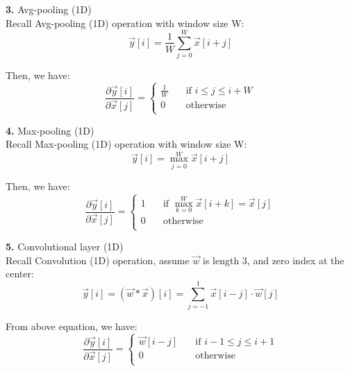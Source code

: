 \begin{description}
\item{\bf \large 3. } Avg-pooling (1D) \\
Recall Avg-pooling (1D) operation with window size W: 
\begin{equation}
	\vec{y}[i] = \frac{1}{W} \sum_{j=0}^W \vec{x}[i + j]
\end{equation}

Then, we have:
\begin{equation}
	\frac{\partial \vec{y}[i]}{\partial \vec{x}[j]} = 
		\begin{cases}
			\frac{1}{W}	& \quad \text{if } i \leq j \leq i + W \\
			0				& \quad \text{otherwise} \\
		\end{cases}
\end{equation}

\item{\bf \large 4. } Max-pooling (1D) \\
Recall Max-pooling (1D) operation with window size W: 
\begin{equation}
	\vec{y}[i] = \max_{j=0}^W \vec{x}[i + j]
\end{equation}

Then, we have:
\begin{equation}
	\frac{\partial \vec{y}[i]}{\partial \vec{x}[j]} = 
		\begin{cases}
			1	& 	\quad \text{if } \max_{k=0}^W \vec{x}[i + k] = \vec{x}[j] \\
			0	& 	\quad \text{otherwise} \\
		\end{cases}
\end{equation}


\item{\bf \large 5. } Convolutional layer (1D)\\
Recall Convolution (1D) operation, assume $\vec{w}$ is length 3, and zero index at the center:
\begin{equation}
	\vec{y}[i] = (\vec{w} \ast \vec{x})[i] = \sum_{j=-1}^1 \vec{x}[i-j] \cdot \vec{w}[j]
\end{equation} 

From above equation, we have:
\begin{equation}
	\frac{\partial \vec{y}[i]}{\partial \vec{x}[j]} =
	\begin{cases}
			\vec{w}[i-j]	& 	\quad \text{if } i-1 \leq j \leq i+1 \\
			0	& 	\quad \text{otherwise} \\
		\end{cases}
\end{equation}


\end{description}
